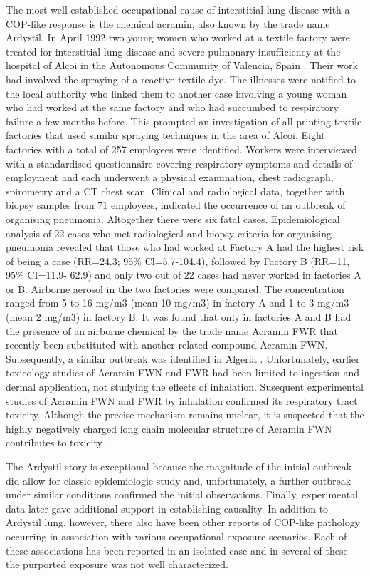 \documentclass[a4paper,12pt]{article}
\begin{document}
The most well-established occupational cause of interstitial lung disease with a COP-like response is the chemical acramin, also known by the trade name Ardystil. In April 1992 two young women who worked at a textile factory were treated for interstitial lung disease and severe pulmonary insufficiency at the hospital of Alcoi in the Autonomous Community of Valencia, Spain \cite{Moya1994}. Their work had involved the spraying of a reactive textile dye. The illnesses were notified to the local authority who linked them to another case involving a young woman who had worked at the same factory and who had succumbed to respiratory failure a few months before. This prompted an investigation of all printing textile factories that used similar spraying techniques in the area of Alcoi. Eight factories with a total of 257 employees were identified. Workers were interviewed with a standardised questionnaire covering respiratory symptoms and details of employment and each underwent a physical examination, chest radiograph, spirometry and a CT chest scan. Clinical and radiological data, together with biopsy samples from 71 employees, indicated the occurrence of an outbreak of organising pneumonia. Altogether there were six fatal cases. Epidemiological analysis of 22 cases who met radiological and biopsy criteria for organising pneumonia revealed that those who had worked at Factory A had the highest risk of being a case (RR=24.3; 95\% Cl=5.7-104.4), followed by Factory B (RR=11, 95\% CI=11.9- 62.9) and only two out of 22 cases had never worked in factories A or B. Airborne aerosol in the two factories were compared. The concentration ranged from 5 to 16 mg/m3 (mean 10 mg/m3) in factory A and 1 to 3 mg/m3 (mean 2 mg/m3) in factory B. It was found that only in factories A and B had the presence of an airborne chemical by the trade name Acramin FWR that recently been substituted with another related compound Acramin FWN. Subsequently, a similar outbreak was identified in Algeria \cite{OuldKadi1994}. Unfortunately, earlier toxicology studies of Acramin FWN and FWR had been limited to ingestion and dermal application, not studying the effects of inhalation. Susequent experimental studies of Acramin FWN and FWR by inhalation confirmed its respiratory tract toxicity. Although the precise mechanism remains unclear, it is suspected that the highly negatively charged long chain molecular structure of Acramin FWN contributes to toxicity \cite{Hoet1999}.

The Ardystil story is exceptional because the magnitude of the initial outbreak did allow for classic epidemiologic study and, unfortunately, a further outbreak under similar conditions confirmed the initial observations. Finally, experimental data later gave additional support in establishing causality. In addition to Ardystil lung, however, there also have been other reports of COP-like pathology occurring in association with various occupational exposure scenarios. Each of these associations has been reported in an isolated case and in several of these the purported exposure was not well characterized.
\end{document}
